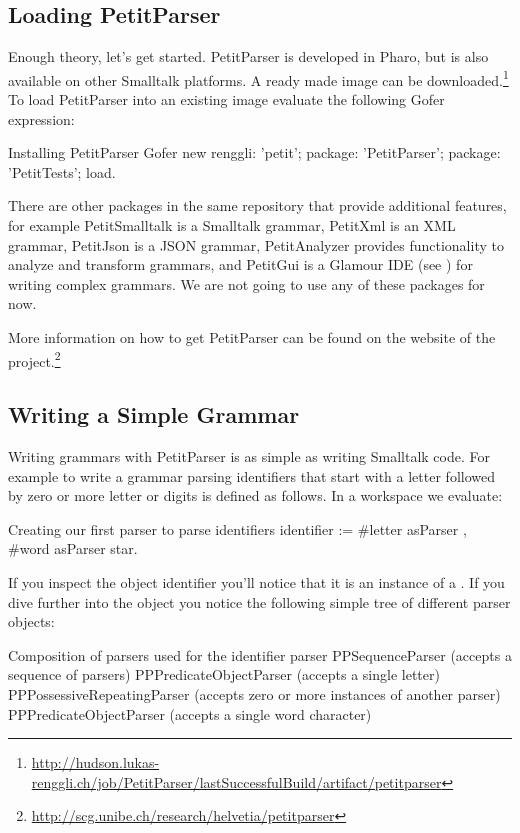 \documentclass[a4paper,10pt,twoside]{book}
\begin{document}
\subsection{Loading PetitParser}

Enough theory, let's get started. PetitParser is developed in Pharo,
but is also available on other Smalltalk platforms. A ready made image
can be
downloaded.\footnote{\url{http://hudson.lukas-renggli.ch/job/PetitParser/lastSuccessfulBuild/artifact/petitparser}}
To load PetitParser into an existing image evaluate the following
Gofer expression:

\begin{script}{Installing PetitParser}
Gofer new
  renggli: 'petit';
  package: 'PetitParser';
  package: 'PetitTests';
  load.
\end{script}

There are other packages in the same repository that provide
additional features, for example PetitSmalltalk is a Smalltalk
grammar, PetitXml is an XML grammar, PetitJson is a JSON grammar,
PetitAnalyzer provides functionality to analyze and transform
grammars, and PetitGui is a Glamour IDE (see ) for
writing complex grammars. We are not going to use any of these
packages for now.

More information on how to get PetitParser can be found on the website
of the
project.\footnote{\url{http://scg.unibe.ch/research/helvetia/petitparser}}

\subsection{Writing a Simple Grammar}

Writing grammars with PetitParser is as simple as writing Smalltalk
code. For example to write a grammar  parsing identifiers that
start with a letter followed by zero or more letter or digits is
defined as follows. In a workspace we evaluate:

\begin{script}{Creating our first parser to parse identifiers}
identifier := #letter asParser , #word asParser star.  
\end{script}

If you inspect the object identifier you'll notice that it is an
instance of a . If you dive further into the
object you notice the following simple tree of different parser
objects:

\begin{script}{Composition of parsers used for the identifier parser}
PPSequenceParser (accepts a sequence of parsers)
    PPPredicateObjectParser (accepts a single letter)
    PPPossessiveRepeatingParser (accepts zero or more instances of another parser)
       PPPredicateObjectParser (accepts a single word character)  
\end{script}
\end{document}
